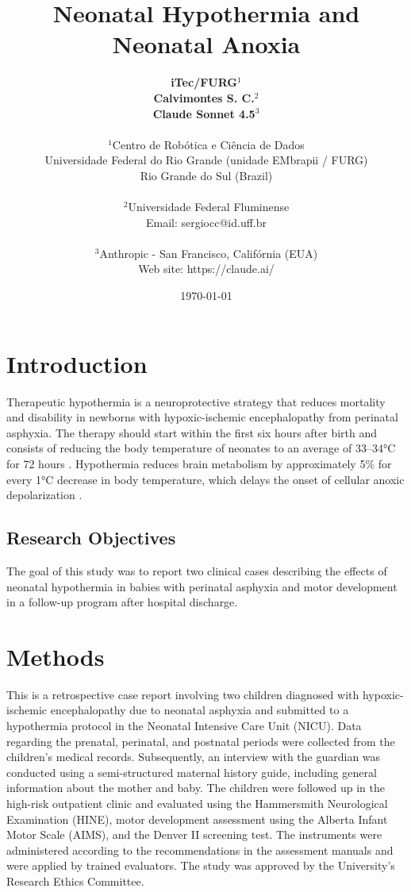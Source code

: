 \documentclass[11pt,a4paper]{article}
\title{\textbf{Neonatal Hypothermia and Neonatal Anoxia}}
\author{
	\textbf{iTec/FURG}$^{1}$ \\
	\textbf{Calvimontes S. C.}$^{2}$ \\
	\textbf{Claude Sonnet 4.5}$^{3}$ \\
	\\
	\small $^{1}$Centro de Robótica e Ciência de Dados \\
	\small Universidade Federal do Rio Grande (unidade EMbrapii / FURG) \\
	\small Rio Grande do Sul (Brazil) \\
	\\
	\small $^{2}$Universidade Federal Fluminense \\
	\small Email: sergiocc@id.uff.br \\
	\\
	\small $^{3}$Anthropic - San Francisco, Califórnia (EUA) \\
	\small Web site: https://claude.ai/
}
\date{\today}
\begin{document}
	
	\maketitle
	
	\newpage
	
	\section{Introduction}
	
	Therapeutic hypothermia is a neuroprotective strategy that reduces mortality and disability in newborns with hypoxic-ischemic encephalopathy from perinatal asphyxia. The therapy should start within the first six hours after birth and consists of reducing the body temperature of neonates to an average of 33–34°C for 72 hours \cite{Azzopardi2014,Thayyil2021,Abate2021}. Hypothermia reduces brain metabolism by approximately 5\% for every 1°C decrease in body temperature, which delays the onset of cellular anoxic depolarization \cite{Silveira2015}.
		
	\subsection{Research Objectives}
	The goal of this study was to report two clinical cases describing the effects of neonatal hypothermia in babies with perinatal asphyxia and motor development in a follow-up program after hospital discharge.
	
	\section{Methods}
	This is a retrospective case report involving two children diagnosed with hypoxic-ischemic encephalopathy due to neonatal asphyxia and submitted to a hypothermia protocol in the Neonatal Intensive Care Unit (NICU). Data regarding the prenatal, perinatal, and postnatal periods were collected from the children's medical records. Subsequently, an interview with the guardian was conducted using a semi-structured maternal history guide, including general information about the mother and baby. The children were followed up in the high-risk outpatient clinic and evaluated using the Hammersmith Neurological Examination (HINE), motor development assessment using the Alberta Infant Motor Scale (AIMS), and the Denver II screening test. The instruments were administered according to the recommendations in the assessment manuals and were applied by trained evaluators. The study was approved by the University's Research Ethics Committee.
	
\end{document}
